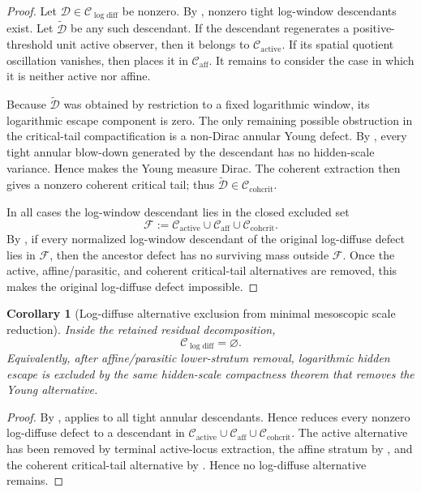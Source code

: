 \documentclass[11pt]{amsart}
\numberwithin{equation}{section}
\theoremstyle{plain}
\newtheorem{corollary}[theorem]{Corollary}
\theoremstyle{definition}
\theoremstyle{remark}
\newcommand{\Cactive}{\mathcal C_{\mathrm{active}}}
\newcommand{\Caff}{\mathcal C_{\mathrm{aff}}}
\newcommand{\Ccohcrit}{\mathcal C_{\mathrm{cohcrit}}}
\newcommand{\Clogdiff}{\mathcal C_{\log\mathrm{diff}}}
\begin{document}
\begin{proof}
Let \(\mathcal D\in\Clogdiff\) be nonzero.  By
, nonzero tight log-window
descendants exist.  Let \(\widetilde{\mathcal D}\) be any such descendant.  If
the descendant regenerates a
positive-threshold unit active observer, then it belongs to \(\Cactive\).  If
its spatial quotient oscillation vanishes, then
 places it in \(\Caff\).  It remains
to consider the case in which it is neither active nor affine.

Because \(\widetilde{\mathcal D}\) was obtained by restriction to a fixed
logarithmic window, its logarithmic escape component is zero.  The only
remaining possible obstruction in the critical-tail compactification is a
non-Dirac annular Young defect.  By
, every tight annular
blow-down generated by the descendant has no hidden-scale variance.  Hence
 makes the Young measure Dirac.
The coherent extraction
 then gives a nonzero coherent
critical tail; thus \(\widetilde{\mathcal D}\in\Ccohcrit\).

In all cases the log-window descendant lies in the closed excluded set
\[
   \mathcal F:=\Cactive\cup\Caff\cup\Ccohcrit .
\]
By , if every normalized log-window
descendant of the original log-diffuse defect lies in \(\mathcal F\), then the
ancestor defect has no surviving mass outside \(\mathcal F\).  Once the active,
affine/parasitic, and coherent critical-tail alternatives are removed, this
makes the original log-diffuse defect impossible.
\end{proof}

\begin{corollary}[Log-diffuse alternative exclusion from minimal mesoscopic scale reduction]
\label{cor:log-diffuse-branch-discharge}
Inside the retained residual decomposition,
\[
   \Clogdiff=\varnothing .
\]
Equivalently, after affine/parasitic lower-stratum removal, logarithmic hidden
escape is excluded by the same hidden-scale compactness theorem that removes
the Young alternative.
\end{corollary}

\begin{proof}
By ,
 applies to all tight
annular descendants.  Hence  reduces
every nonzero log-diffuse defect to a descendant in
\(\Cactive\cup\Caff\cup\Ccohcrit\).  The active alternative has been removed by
terminal active-locus extraction, the affine stratum by
, and the coherent critical-tail
alternative by .  Hence no
log-diffuse alternative remains.
\end{proof}
\end{document}
